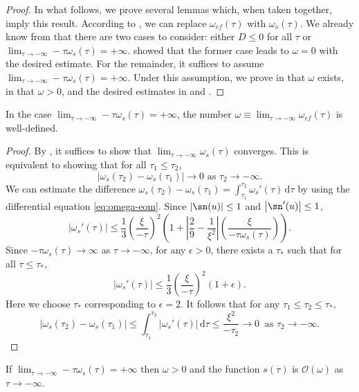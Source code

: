 \begin{proof}
In what follows, we prove several lemmas which, when taken together, imply this result. According to , we can replace $\omega_{ef}(\tau)$ with $\omega_{s}(\tau)$. We already know from  that there are two cases to consider: either $D\leq0$ for all $\tau$ or $\lim_{\tau\to-\infty}-\tau\omega_{s}(\tau)=+\infty$.  showed that the former case leads to $\omega=0$ with the desired estimate. For the remainder, it suffices to assume $\lim_{\tau\to-\infty}-\tau\omega_{s}(\tau)=+\infty$. Under this assumption, we prove in  that $\omega$ exists, in  that $\omega>0$, and the desired estimates in  and . 
\end{proof}
%
\begin{lem}
\label{lem:ws-limit-exists}In the case $\lim_{\tau\to-\infty}-\tau\omega_{s}(\tau)=+\infty$, the number $\omega\equiv\lim_{\tau\to-\infty}\omega_{ef}(\tau)$ is well-defined.
\end{lem}

\begin{proof}
By , it suffices to show that $\lim_{\tau\to-\infty}\omega_{s}(\tau)$ converges. This is equivalent to showing that for all $\tau_{1}\leq\tau_{2}$, 
\[
\left|\omega_{s}(\tau_{2})-\omega_{s}(\tau_{1})\right|\to0\textrm{ as }\tau_{2}\to-\infty.
\]
 We can estimate the difference $\omega_{s}(\tau_{2})-\omega_{s}(\tau_{1})=\int_{\tau_{1}}^{\tau_{2}}\omega_{s}'(\tau)\,\mathrm{d}\tau$ by using the differential equation \eqref{eq:omega-eom}. Since $\left|\sn(u)\right|\leq1$ and $\left|\sn'(u)\right|\leq1$, 
\[
\left|\omega_{s}'(\tau)\right|\leq\frac{1}{3}\left(\frac{\xi}{-\tau}\right)^{2}\left(1+\left|\frac{2}{9}-\frac{1}{\xi^{2}}\right|\left(\frac{\xi}{-\tau\omega_{s}(\tau)}\right)\right).
\]
 Since $-\tau\omega_{s}(\tau)\to\infty$ as $\tau\to-\infty$, for any $\epsilon>0$, there exists a $\tau_{*}$ such that for all $\tau\leq\tau_{*},$ 
\[
\left|\omega_{s}'(\tau)\right|\leq\frac{1}{3}\left(\frac{\xi}{-\tau}\right)^{2}\left(1+\epsilon\right).
\]
 Here we choose $\tau_{*}$ corresponding to $\epsilon=2$. It follows that for any $\tau_{1}\leq\tau_{2}\leq\tau_{*}$, 
\[
\left|\omega_{s}(\tau_{2})-\omega_{s}(\tau_{1})\right|\leq\int_{\tau_{1}}^{\tau_{2}}\left|\omega_{s}'(\tau)\right|\,\mathrm{d}\tau\leq\frac{\xi^{2}}{-\tau_{2}}\to0\ \textrm{ as }\ensuremath{\tau_{2}\to-\infty}.
\]
\end{proof}
\begin{lem}
\label{lem:omega-positive}If $\lim_{\tau\to-\infty}-\tau\omega_{s}(\tau)=+\infty$ then $\omega>0$ and the function $s(\tau)$ is $\mathcal{O}(\omega)$ as $\tau\to-\infty$. 
\end{lem}

